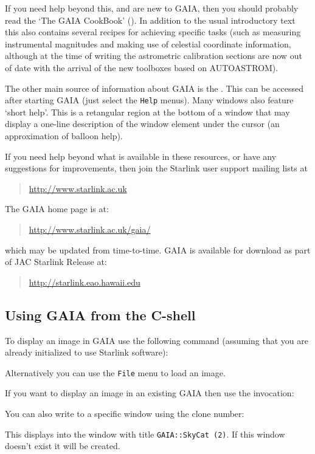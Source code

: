 \documentclass[twoside,11pt,nolof]{starlink}
\providecommand{\mytt}[1]{{\texttt{#1}}}
\begin{document}
If you need help beyond this, and are new to GAIA, then you should probably
read the `The GAIA CookBook' (). In addition to the usual
introductory text this also contains several recipes for achieving specific
tasks (such as measuring instrumental magnitudes and making use of celestial
coordinate information, although at the time of writing the astrometric
calibration sections are now out of date with the arrival of the new toolboxes
based on AUTOASTROM).

The other main source of information about GAIA is the
.
This can be accessed after starting GAIA (just select the
\mytt{Help} menus). Many windows also feature `short help'. This is a
retangular region at the bottom of a window that may display a
one-line description of the window element under the cursor (an
approximation of balloon help).

If you need help beyond what is available in these resources, or have
any suggestions for improvements, then join the Starlink user support
mailing lists at
\begin{quote}
\url{http://www.starlink.ac.uk}
\end{quote}
The GAIA home page is at:
\begin{quote}
\url{http://www.starlink.ac.uk/gaia/}
\end{quote}
which may be updated from time-to-time. GAIA is available for download
as part of JAC Starlink Release at:
\begin{quote}
\url{http://starlink.eao.hawaii.edu}
\end{quote}

\subsection{Using GAIA from the C-shell}

To display an image in GAIA use the following command
(assuming that you are already initialized to use Starlink software):
\begin{terminalv}
\end{terminalv}
Alternatively you can use the \mytt{File} menu to load an image.

If you want to display an image in an existing GAIA then use the
invocation:
\begin{terminalv}
\end{terminalv}
You can also write to a specific window using the clone number:
\begin{terminalv}
\end{terminalv}
This displays into the window with title \mytt{GAIA::SkyCat (2)}.
If this window doesn't exist it will be created.
\end{document}
